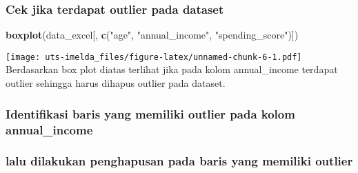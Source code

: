 \documentclass[
]{article}
\newenvironment{Shaded}{\begin{snugshade}}{\end{snugshade}}
\newcommand{\FunctionTok}[1]{\textcolor[rgb]{0.13,0.29,0.53}{\textbf{#1}}}
\newcommand{\NormalTok}[1]{#1}
\newcommand{\StringTok}[1]{\textcolor[rgb]{0.31,0.60,0.02}{#1}}
\begin{document}
\hypertarget{cek-jika-terdapat-outlier-pada-dataset}{%
\subsubsection{Cek jika terdapat outlier pada
dataset}\label{cek-jika-terdapat-outlier-pada-dataset}}

\begin{Shaded}
\begin{Highlighting}[]
\FunctionTok{boxplot}\NormalTok{(data\_excel[, }\FunctionTok{c}\NormalTok{(}\StringTok{"age"}\NormalTok{, }\StringTok{"annual\_income"}\NormalTok{, }\StringTok{"spending\_score"}\NormalTok{)])}
\end{Highlighting}
\end{Shaded}

\texttt{[image: uts-imelda\_files/figure-latex/unnamed-chunk-6-1.pdf]}
Berdasarkan box plot diatas terlihat jika pada kolom annual\_income
terdapat outlier sehingga harus dihapus outlier pada dataset.

\hypertarget{identifikasi-baris-yang-memiliki-outlier-pada-kolom-annual_income}{%
\subsubsection{Identifikasi baris yang memiliki outlier pada kolom
annual\_income}\label{identifikasi-baris-yang-memiliki-outlier-pada-kolom-annual_income}}

\hypertarget{lalu-dilakukan-penghapusan-pada-baris-yang-memiliki-outlier}{%
\subsubsection{lalu dilakukan penghapusan pada baris yang memiliki
outlier}\label{lalu-dilakukan-penghapusan-pada-baris-yang-memiliki-outlier}}
\end{document}

